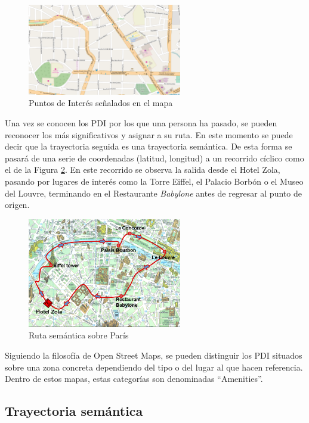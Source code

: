 \begin{figure}[h]
  \centering
    \includegraphics[width=0.6\textwidth]{../img/poi/poi.png}
  \caption{Puntos de Interés señalados en el mapa}
  \label{puntosdeinteres}
\end{figure}


Una vez se conocen los PDI por los que una persona ha pasado, se pueden reconocer los más significativos y asignar a su ruta. En este momento se puede decir que la trayectoria seguida es una trayectoria semántica. De esta forma se pasará de una serie de coordenadas (latitud, longitud) a un recorrido cíclico como el de la Figura \ref{rutasemantica}. En este recorrido se observa la salida desde el Hotel Zola, pasando por lugares de interés como la Torre Eiffel, el Palacio Borbón o el Museo del Louvre, terminando en el Restaurante \textit{Babylone} antes de regresar al punto de origen.

\begin{figure}[h]
  \centering
    \includegraphics[width=0.6\textwidth]{../img/poi/ruta.png}
  \caption{Ruta semántica sobre París}
  \label{rutasemantica}
\end{figure}


Siguiendo la filosofía de Open Street Maps, se pueden distinguir los PDI situados sobre una zona concreta dependiendo del tipo o del lugar al que hacen referencia. Dentro de estos mapas, estas categorías son denominadas ``Amenities''.

\subsection{Trayectoria semántica}

